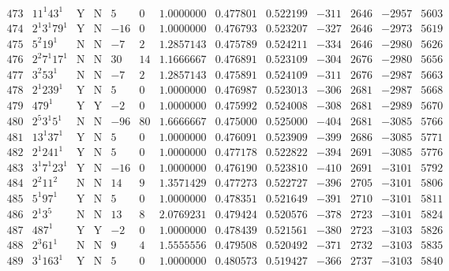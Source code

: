 \documentclass[11pt,reqno,a4letter]{article}
\numberwithin{equation}{section}
\numberwithin{figure}{section}
\numberwithin{table}{section}
\theoremstyle{plain}
\numberwithin{theorem}{section}
\theoremstyle{definition}
\begin{document}
\begin{table}[ht]
\begin{equation*}
{\begin{array}{cc|cc|ccc|cc|cccc}
 473 & 11^1 43^1 & \text{Y} & \text{N} & 5 & 0 & 1.0000000 & 0.477801 & 0.522199 & -311 & 2646 & -2957 & 5603 \\
 474 & 2^1 3^1 79^1 & \text{Y} & \text{N} & -16 & 0 & 1.0000000 & 0.476793 & 0.523207 & -327 & 2646 & -2973 & 5619 \\
 475 & 5^2 19^1 & \text{N} & \text{N} & -7 & 2 & 1.2857143 & 0.475789 & 0.524211 & -334 & 2646 & -2980 & 5626 \\
 476 & 2^2 7^1 17^1 & \text{N} & \text{N} & 30 & 14 & 1.1666667 & 0.476891 & 0.523109 & -304 & 2676 & -2980 & 5656 \\
 477 & 3^2 53^1 & \text{N} & \text{N} & -7 & 2 & 1.2857143 & 0.475891 & 0.524109 & -311 & 2676 & -2987 & 5663 \\
 478 & 2^1 239^1 & \text{Y} & \text{N} & 5 & 0 & 1.0000000 & 0.476987 & 0.523013 & -306 & 2681 & -2987 & 5668 \\
 479 & 479^1 & \text{Y} & \text{Y} & -2 & 0 & 1.0000000 & 0.475992 & 0.524008 & -308 & 2681 & -2989 & 5670 \\
 480 & 2^5 3^1 5^1 & \text{N} & \text{N} & -96 & 80 & 1.6666667 & 0.475000 & 0.525000 & -404 & 2681 & -3085 & 5766 \\
 481 & 13^1 37^1 & \text{Y} & \text{N} & 5 & 0 & 1.0000000 & 0.476091 & 0.523909 & -399 & 2686 & -3085 & 5771 \\
 482 & 2^1 241^1 & \text{Y} & \text{N} & 5 & 0 & 1.0000000 & 0.477178 & 0.522822 & -394 & 2691 & -3085 & 5776 \\
 483 & 3^1 7^1 23^1 & \text{Y} & \text{N} & -16 & 0 & 1.0000000 & 0.476190 & 0.523810 & -410 & 2691 & -3101 & 5792 \\
 484 & 2^2 11^2 & \text{N} & \text{N} & 14 & 9 & 1.3571429 & 0.477273 & 0.522727 & -396 & 2705 & -3101 & 5806 \\
 485 & 5^1 97^1 & \text{Y} & \text{N} & 5 & 0 & 1.0000000 & 0.478351 & 0.521649 & -391 & 2710 & -3101 & 5811 \\
 486 & 2^1 3^5 & \text{N} & \text{N} & 13 & 8 & 2.0769231 & 0.479424 & 0.520576 & -378 & 2723 & -3101 & 5824 \\
 487 & 487^1 & \text{Y} & \text{Y} & -2 & 0 & 1.0000000 & 0.478439 & 0.521561 & -380 & 2723 & -3103 & 5826 \\
 488 & 2^3 61^1 & \text{N} & \text{N} & 9 & 4 & 1.5555556 & 0.479508 & 0.520492 & -371 & 2732 & -3103 & 5835 \\
 489 & 3^1 163^1 & \text{Y} & \text{N} & 5 & 0 & 1.0000000 & 0.480573 & 0.519427 & -366 & 2737 & -3103 & 5840 \\

\end{array}}
\end{equation*}
\end{table}
\end{document}
